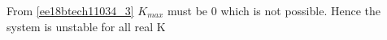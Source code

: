 \begin{enumerate}[label=\thesubsection.\arabic*.,ref=\thesubsection.\theenumi]
\begin{table}[!ht]
\centering

\caption{}
\label{table:ee18btech11034_table2}
\end{table}
From \eqref{ee18btech11034_3} $K_{max}$ must be 0 which is not possible.
Hence the system is unstable for all real K
\end{enumerate}
